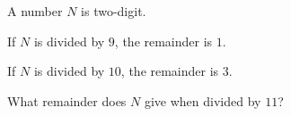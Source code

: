 A number $N$ is two-digit.

If $N$ is divided by $9$, the remainder is $1$.

If $N$ is divided by $10$, the remainder is $3$.

What remainder does $N$ give when divided by $11$?
